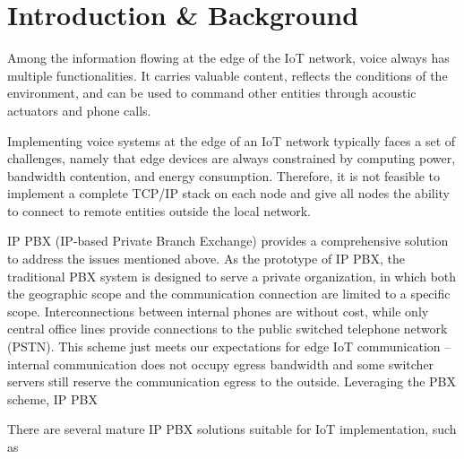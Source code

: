 \section{Introduction \& Background}	\label{sec:introduction-background}

Among the information flowing at the edge of the IoT network, voice always has multiple functionalities. It carries valuable content, reflects the conditions of the environment, and can be used to command other entities through acoustic actuators and phone calls.

Implementing voice systems at the edge of an IoT network typically faces a set of challenges, namely that edge devices are always constrained by computing power, bandwidth contention, and energy consumption. Therefore, it is not feasible to implement a complete TCP/IP stack on each node and give all nodes the ability to connect to remote entities outside the local network.

IP PBX (IP-based Private Branch Exchange) provides a comprehensive solution to address the issues mentioned above. As the prototype of IP PBX, the traditional PBX system is designed to serve a private organization, in which both the geographic scope and the communication connection are limited to a specific scope. Interconnections between internal phones are without cost, while only central office lines provide connections to the public switched telephone network (PSTN). This scheme just meets our expectations for edge IoT communication -- internal communication does not occupy egress bandwidth and some switcher servers still reserve the communication egress to the outside. Leveraging the PBX scheme, IP PBX

There are several mature IP PBX solutions suitable for IoT implementation, such as 